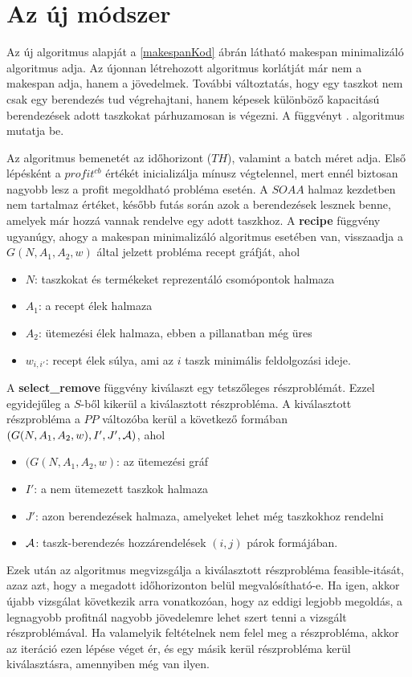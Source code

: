 \chapter{Az új módszer}
Az új algoritmus alapját a \ref{makespanKod} ábrán látható makespan minimalizáló algoritmus adja. Az újonnan létrehozott algoritmus korlátját már nem a makespan adja, hanem a jövedelmek. További változtatás, hogy egy taszkot nem csak egy berendezés tud végrehajtani, hanem képesek különböző kapacitású berendezések adott taszkokat párhuzamosan is végezni. A függvényt . algoritmus mutatja be.

Az algoritmus bemenetét az időhorizont ($TH$), valamint a batch méret adja. Első lépésként a $profit^{cb}$ értékét inicializálja mínusz végtelennel, mert ennél biztosan nagyobb lesz a profit megoldható probléma esetén. A $SOAA$ halmaz kezdetben nem tartalmaz értéket, később futás során azok a berendezések lesznek benne, amelyek már hozzá vannak rendelve egy adott taszkhoz. A \textbf{recipe} függvény ugyanúgy, ahogy a makespan minimalizáló algoritmus esetében van, visszaadja a $G(N,A_1,A_2,w)$ által jelzett probléma recept gráfját, ahol
\begin{itemize}
  \item[] $N$: taszkokat és termékeket reprezentáló csomópontok halmaza	
  \item[] $A_1$: a recept élek halmaza
  \item[] $A_2$: ütemezési élek halmaza, ebben a pillanatban még üres
  \item[] $w_{i,i'}$: recept élek súlya, ami az $i$ taszk minimális feldolgozási ideje.
\end{itemize} 

A \textbf{select\_remove} függvény kiválaszt egy tetszőleges részproblémát. Ezzel egyidejűleg a $S$-ből kikerül a kiválasztott részprobléma. A kiválasztott részprobléma a $PP$ változóba kerül a következő formában  $(G(N,A_1,A_2,w),I',J',{\cal A})$, ahol 
\begin{itemize}
  \item[] $(G(N,A_1,A_2,w)$: az ütemezési gráf	
  \item[] $I'$: a nem ütemezett taszkok halmaza
  \item[] $J'$: azon berendezések halmaza, amelyeket lehet még taszkokhoz rendelni
  \item[] ${\cal A}$: taszk-berendezés hozzárendelések $(i,j)$ párok formájában.
\end{itemize}

Ezek után az algoritmus megvizsgálja a kiválasztott részprobléma feasible-itását, azaz azt, hogy a megadott időhorizonton belül megvalósítható-e. Ha igen, akkor újabb vizsgálat következik arra vonatkozóan, hogy az eddigi legjobb megoldás, a legnagyobb profitnál nagyobb jövedelemre lehet szert tenni a vizsgált részproblémával. Ha valamelyik feltételnek nem felel meg a részprobléma, akkor az iteráció ezen lépése véget ér, és egy másik kerül részprobléma kerül kiválasztásra, amennyiben még van ilyen.

